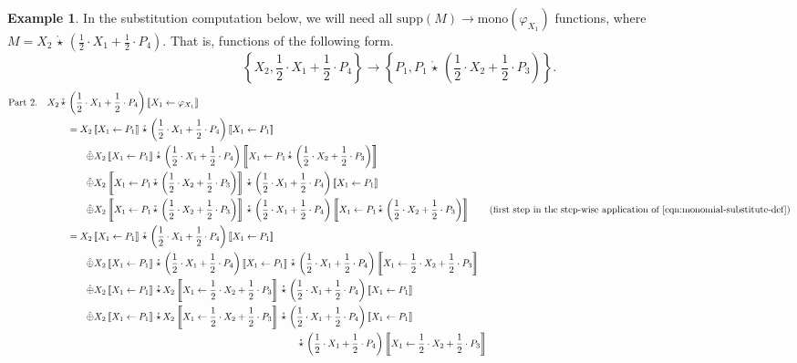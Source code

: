 \documentclass[10pt]{amsart}
\theoremstyle{plain}
\theoremstyle{definition}
\newtheorem{example}[lemma]{Example}
\providecommand{\cplus}[0]{\ensuremath{\hat{\oplus}}\xspace}
\providecommand{\cmult}[0]{\ensuremath{{\,\mathring{\star}\,}}\xspace}
\providecommand{\mono}[0]{\ensuremath{\mathrm{mono}}\xspace}
\providecommand{\elem}[0]{\ensuremath{\mathrm{supp}}\xspace}
\providecommand{\substitute}[2]{\ensuremath{\left\llbracket {#1} \gets {#2} \right\rrbracket}\xspace}
\begin{document}
\begin{example}
In the substitution computation below, we will need all $\elem(M)\to\mono(\varphi_{X_1})$ functions, where $M=X_2\cmult\left(\frac12\cdot X_1  + \frac12\cdot P_4\right)$.
That is, functions of the following form. 
    $$ \left\{ X_2, \frac12\cdot X_1 + \frac12\cdot P_4\right\} \to \left\{ P_1, P_1\cmult\left(\frac12\cdot X_2 + \frac12\cdot P_3\right) \right\}.$$
{\footnotesize\allowdisplaybreaks
\begin{align*}
    \text{Part 2.} && X_2\cmult&\left(\frac12\cdot X_1  + \frac12\cdot P_4\right)\substitute{X_1}{\varphi_{X_1}}\\
        &&&= X_2\substitute{X_1}{P_1} \cmult \left(\frac12\cdot X_1  + \frac12\cdot P_4\right)\substitute{X_1}{P_1}\\
        &&&\qquad \cplus X_2\substitute{X_1}{P_1} \cmult \left(\frac12\cdot X_1  + \frac12\cdot P_4\right)\substitute{X_1}{P_1\cmult\left(\frac12\cdot X_2 + \frac12\cdot P_3\right)}\\
        &&&\qquad \cplus X_2\substitute{X_1}{P_1\cmult\left(\frac12\cdot X_2 + \frac12\cdot P_3\right)} \cmult \left(\frac12\cdot X_1  + \frac12\cdot P_4\right)\substitute{X_1}{P_1}\\
        &&&\qquad \cplus X_2\substitute{X_1}{P_1\cmult\left(\frac12\cdot X_2 + \frac12\cdot P_3\right)} \cmult \left(\frac12\cdot X_1  + \frac12\cdot P_4\right)\substitute{X_1}{P_1\cmult\left(\frac12\cdot X_2 + \frac12\cdot P_3\right)}
            \tag{first step in the step-wise application of \eqref{eqn:monomial-substitute-def}}\\
        &&&= X_2\substitute{X_1}{P_1} \cmult \left(\frac12\cdot X_1  + \frac12\cdot P_4\right)\substitute{X_1}{P_1}\\
        &&&\qquad \cplus X_2\substitute{X_1}{P_1} \cmult \left(\frac12\cdot X_1  + \frac12\cdot P_4\right)\substitute{X_1}{P_1} \cmult \left(\frac12\cdot X_1  + \frac12\cdot P_4\right)\substitute{X_1}{\frac12\cdot X_2 + \frac12\cdot P_3}\\
        &&&\qquad \cplus X_2\substitute{X_1}{P_1} \cmult X_2\substitute{X_1}{\frac12\cdot X_2 + \frac12\cdot P_3} \cmult\left(\frac12\cdot X_1  + \frac12\cdot P_4\right)\substitute{X_1}{P_1}\\
        &&&\qquad \cplus X_2\substitute{X_1}{P_1} \cmult X_2\substitute{X_1}{\frac12\cdot X_2 + \frac12\cdot P_3} \cmult \left(\frac12\cdot X_1  + \frac12\cdot P_4\right)\substitute{X_1}{P_1} \\
        &&& \qquad\qquad\qquad\qquad\qquad\qquad\qquad\qquad\qquad\qquad\qquad\qquad \cmult \left(\frac12\cdot X_1  + \frac12\cdot P_4\right)\substitute{X_1}{\frac12\cdot X_2 + \frac12\cdot P_3}

\end{align*}}
\end{example}
\end{document}
